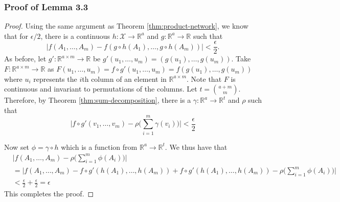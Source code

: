 \documentclass[12pt]{article}
\newcommand{\R}{\mathbb R}
\begin{document}
\subsubsection{Proof of Lemma 3.3}
\begin{proof}
    Using the same argument as Theorem \ref{thm:product-network}, we know that for $\epsilon/2$, there is a continuous $h: \mathcal{X} \to \R^a$ and $g: \R^{a} \to \R$ such that 
    \begin{equation*}
        |f(A_1, \dots, A_m) - f(g \circ h(A_1), \dots, g \circ h (A_m))| < \frac{\epsilon}{2}.
    \end{equation*}
    As before, let $g': \R^{a \times m} \to \R$ be $g'(u_1, \dots, u_m) = (g(u_1), \dots, g(u_m))$.
    Take $F: \R^{a \times m} \to \R$ as $F(u_1,\dots, u_m) = f \circ g' (u_1, \dots, u_m) = f(g(u_1), \dots, g(u_m))$ where $u_i$ represents the $i$th column of an element in $\R^{a \times m}$. Note that $F$ is continuous and invariant to permutations of the columns. Let $t = \binom{a + m}{m}$. Therefore, by Theorem \ref{thm:sum-decomposition}, there is a $\gamma: \R^a \to \R^{t}$ and $\rho$ such that
    \begin{equation*}
        \Bigg|f\circ g'(v_1, \dots, v_m) - \rho\Big(\sum_{i = 1}^m \gamma(v_i) \Big) \Bigg| < \frac{\epsilon}{2}
    \end{equation*}

Now set $\phi = \gamma \circ h$ which is a function from $\R^a \to \R^t$. We thus have that
    \begin{align*}
       &\Big|f(A_1, \dots, A_m) - \rho\Big(\sum_{i = 1}^m \phi(A_i)\Big)\Big| \\
        &= \Bigg|f(A_1, \dots, A_m) - f \circ g'(h(A_1),\dots, h(A_m)) + f \circ g'(h(A_1),\dots,  h(A_m)) - \rho\Big(\sum_{i = 1}^m \phi(A_i)\Big)\Bigg| \\
        &< \frac{\epsilon}{2} + \frac{\epsilon}{2}= \epsilon
    \end{align*}
This completes the proof. 
\end{proof}

    
\end{document}
